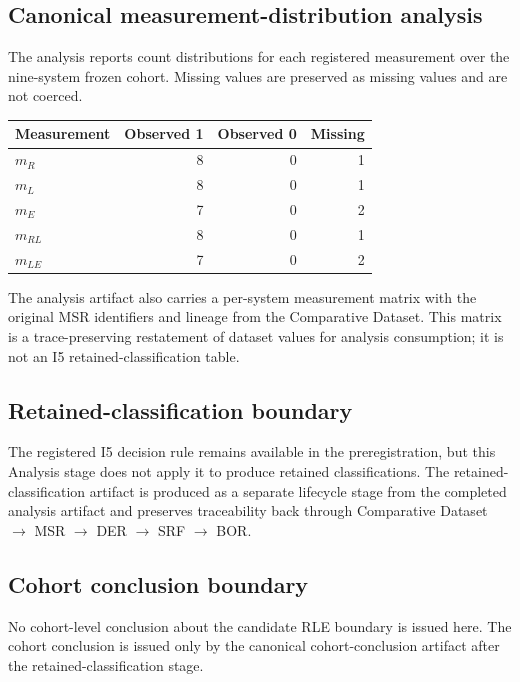 \subsection{Canonical measurement-distribution analysis}
The analysis reports count distributions for each registered measurement over the nine-system frozen cohort. Missing values are preserved as missing values and are not coerced.

\begin{center}
\begin{tabular}{lrrr}
\hline
Measurement & Observed 1 & Observed 0 & Missing \\
\hline
$m_R$ & 8 & 0 & 1 \\
$m_L$ & 8 & 0 & 1 \\
$m_E$ & 7 & 0 & 2 \\
$m_{RL}$ & 8 & 0 & 1 \\
$m_{LE}$ & 7 & 0 & 2 \\
\hline
\end{tabular}
\end{center}

The analysis artifact also carries a per-system measurement matrix with the original MSR identifiers and lineage from the Comparative Dataset. This matrix is a trace-preserving restatement of dataset values for analysis consumption; it is not an I5 retained-classification table.

\subsection{Retained-classification boundary}
The registered I5 decision rule remains available in the preregistration, but this Analysis stage does not apply it to produce retained classifications. The retained-classification artifact is produced as a separate lifecycle stage from the completed analysis artifact and preserves traceability back through Comparative Dataset $\rightarrow$ MSR $\rightarrow$ DER $\rightarrow$ SRF $\rightarrow$ BOR.

\subsection{Cohort conclusion boundary}
No cohort-level conclusion about the candidate RLE boundary is issued here. The cohort conclusion is issued only by the canonical cohort-conclusion artifact after the retained-classification stage.
